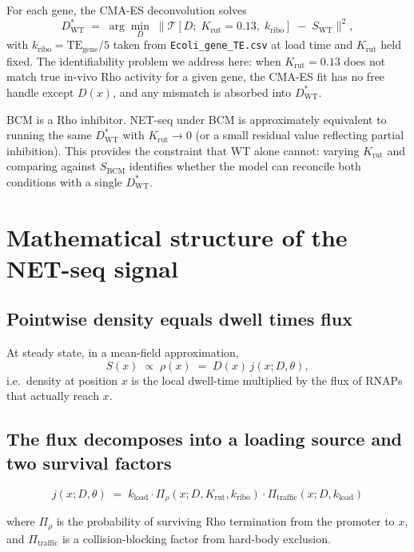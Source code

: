 \documentclass[11pt]{article}
\newcommand{\Krut}{K_{\text{rut}}}
\newcommand{\kload}{k_{\text{load}}}
\newcommand{\kribo}{k_{\text{ribo}}}
\newcommand{\Dstar}{D^{\!*}}
\newcommand{\DstarWT}{\Dstar_{\text{WT}}}
\newcommand{\SWT}{S_{\text{WT}}}
\newcommand{\SBCM}{S_{\text{BCM}}}
\begin{document}
For each gene, the CMA-ES deconvolution solves
\begin{equation}
  \DstarWT \;=\; \arg\min_{D} \;\bigl\lVert\mathcal{T}[D;\;\Krut=0.13,\;\kribo]
  \;-\; \SWT\bigr\rVert^2,
\end{equation}
with $\kribo = \text{TE}_{\text{gene}}/5$ taken from
\texttt{Ecoli\_gene\_TE.csv} at load time and $\Krut$ held fixed. The
identifiability problem we address here: when $\Krut=0.13$ does not
match true in-vivo Rho activity for a given gene, the CMA-ES fit has no
free handle except $D(x)$, and any mismatch is absorbed into $\DstarWT$.

BCM is a Rho inhibitor. NET-seq under BCM is approximately equivalent to
running the same $\DstarWT$ with $\Krut \to 0$ (or a small residual value
reflecting partial inhibition). This provides the constraint that WT
alone cannot: varying $\Krut$ and comparing against $\SBCM$ identifies
whether the model can reconcile both conditions with a single $\DstarWT$.

\section{Mathematical structure of the NET-seq signal}
\label{sec:math}

\subsection{Pointwise density equals dwell times flux}

At steady state, in a mean-field approximation,
\begin{equation}
  S(x) \;\propto\; \rho(x) \;=\; D(x)\,j(x;D,\theta),
\end{equation}
i.e.\ density at position $x$ is the local dwell-time multiplied by the
flux of RNAPs that actually reach $x$.

\subsection{The flux decomposes into a loading source and two survival factors}

\begin{equation}
  j(x;D,\theta) \;=\; \kload \cdot \Pi_{\rho}(x;D,\Krut,\kribo)
                   \cdot \Pi_{\text{traffic}}(x;D,\kload)
\end{equation}

where $\Pi_{\rho}$ is the probability of surviving Rho termination from
the promoter to $x$, and $\Pi_{\text{traffic}}$ is a collision-blocking
factor from hard-body exclusion.
\end{document}
